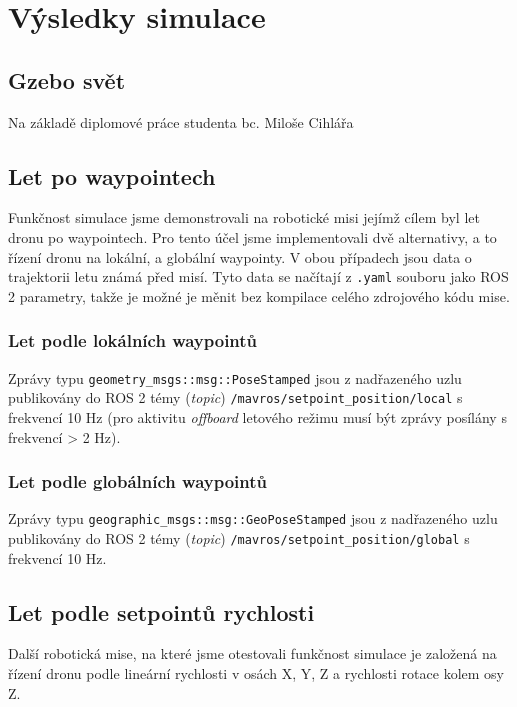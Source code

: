 \chapter{Výsledky simulace}

\section{Gzebo svět}

Na základě diplomové práce studenta bc. Miloše Cihlářa 

\section{Let po waypointech}

Funkčnost simulace jsme demonstrovali na robotické misi jejímž cílem byl let dronu po waypointech. Pro tento účel jsme implementovali dvě alternativy, a to řízení dronu na lokální, a globální waypointy. V obou případech jsou data o trajektorii letu známá před misí. Tyto data se načítají z \texttt{.yaml} souboru jako ROS 2 parametry, takže je možné je měnit bez kompilace celého zdrojového kódu mise. 

\subsection{Let podle lokálních waypointů}

Zprávy typu \texttt{geometry\_msgs::msg::PoseStamped} jsou z nadřazeného uzlu publikovány do ROS 2 témy (\textit{topic}) \texttt{/mavros/setpoint\_position/local} s frekvencí 10 Hz (pro aktivitu \textit{offboard} letového režimu musí být zprávy posílány s frekvencí > 2 Hz).

\subsection{Let podle globálních waypointů}

Zprávy typu \texttt{geographic\_msgs::msg::GeoPoseStamped} jsou z nadřazeného uzlu publikovány do ROS 2 témy (\textit{topic}) \texttt{/mavros/setpoint\_position/global} s frekvencí 10 Hz.

\section{Let podle setpointů rychlosti}

Další robotická mise, na které jsme otestovali funkčnost simulace je založená na řízení dronu podle lineární rychlosti v osách X, Y, Z a rychlosti rotace kolem osy Z. 

